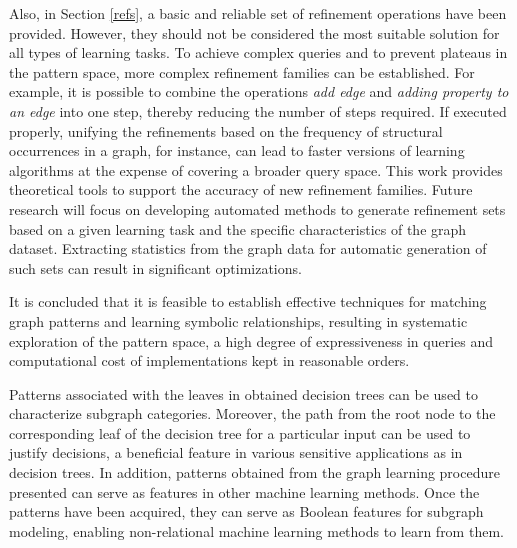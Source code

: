 \documentclass[mathematics,article,submit,pdftex,moreauthors]{Definitions/mdpi}
\begin{document}
Also, in Section \ref{refs}, a basic and reliable set of refinement operations have been provided. However, they should not be considered the most suitable solution for all types of learning tasks. To achieve complex queries and to prevent plateaus in the pattern space, more complex refinement families can be established. For example, it is possible to combine the operations \emph{ add edge} and \emph{adding property to an edge} into one step, thereby reducing the number of steps required. If executed properly, unifying the refinements based on the frequency of structural occurrences in a graph, for instance, can lead to faster versions of learning algorithms at the expense of covering a broader query space. This work provides theoretical tools to support the accuracy of new refinement families. Future research will focus on developing automated methods to generate refinement sets based on a given learning task and the specific characteristics of the graph dataset. Extracting statistics from the graph data for automatic generation of such sets can result in significant optimizations. 

It is concluded that it is feasible to establish effective techniques for matching graph patterns and learning symbolic relationships, resulting in systematic exploration of the pattern space, a high degree of expressiveness in queries and computational cost of implementations kept in reasonable orders.

Patterns associated with the leaves in obtained decision trees can be used to characterize subgraph categories. Moreover, the path from the root node to the corresponding leaf of the decision tree for a particular input can be used to justify decisions, a beneficial feature in various sensitive applications as in decision trees. In addition, patterns obtained from the graph learning procedure presented can serve as features in other machine learning methods. Once the patterns have been acquired, they can serve as Boolean features for subgraph modeling, enabling non-relational machine learning methods to learn from them.
\end{document}

